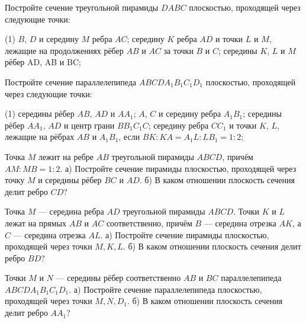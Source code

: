 \begin{class}[number=3]
	\begin{listofex}
		\item Постройте сечение треугольной пирамиды \( DABC \) плоскостью,
		проходящей через следующие точки:
		\begin{tasks}(1)
			\task \( B \), \( D \) и середину \( M \) ребра \( AC \);
			\task середину \( K \) ребра \( AD \) и точки \( L \) и \( M \), лежащие на продолжениях
			рёбер \( AB \) и \( AC \) за точки \( B \) и \( C \);
			\task середины \( K \), \( L \) и \( M \) рёбер AD, AB и BC;
		\end{tasks}
		\item Постройте сечение параллелепипеда \( ABCDA_1B_1C_1D_1 \)
		плоскостью, проходящей через следующие точки:
		\begin{tasks}(1)
			\task середины рёбер \( AB \), \( AD \) и \( AA_1 \);
			\task \( A \), \( C \) и середину ребра \( A_1B_1 \);
			\task середины рёбер \( AA_1 \), \( AD \) и центр грани \( BB_1C_1C \);
			\task середину ребра \( CC_1 \) и точки \( K \), \( L \), лежащие на рёбрах \( AB \) и \( A_1B_1 \),
			если \( BK : KA= A_1L : LB_1=1 : 2 \);
		\end{tasks}
		\item Точка \(M\) лежит на ребре \(AB\) треугольной пирамиды \(ABCD\), причём \(AM : MB = 1:2\). а) Постройте сечение пирамиды плоскостью, проходящей через точку \(M\) и середины рёбер \(BC\) и \(AD\). б) В каком отношении плоскость сечения делит ребро \(CD\)?
		\item Точка \(M\) — середина ребра \(AD\) треугольной пирамиды \(ABCD\). Точки \(K\) и \(L\) лежат на прямых \(AB\) и \(AC\) соответственно, причём \(B\) --- середина отрезка \(AK\), а \(C\) — середина отрезка \(AL\). а) Постройте сечение пирамиды плоскостью, проходящей через точки \(M, K, L\). б) В каком отношении плоскость сечения делит ребро \(BD\)?
		\item Точки \(M\) и \(N\) — середины рёбер соответственно \(AB\) и \(BC\) параллелепипеда \(ABCDA_1B_1C_1D_1\).
		а) Постройте сечение параллелепипеда плоскостью, проходящей через точки \(M, N, D_1\). б) В каком отношении плоскость сечения делит ребро \(AA_1\)?
	\end{listofex}
\end{class}

